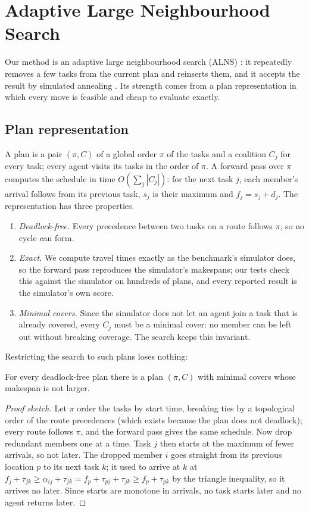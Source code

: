\section{Adaptive Large Neighbourhood Search}
\label{sec:method}

Our method is an adaptive large neighbourhood search (ALNS) \cite{shaw1998using,ropke2006adaptive,pisinger2010large}:
it repeatedly removes a few tasks from the current plan and reinserts them, and it accepts the result by simulated
annealing \cite{kirkpatrick1983optimization}. Its strength comes from a plan representation in which every move is
feasible and cheap to evaluate exactly.

\subsection{Plan representation}
\label{sec:repr}

A plan is a pair $(\pi, C)$ of a global order $\pi$ of the tasks and a coalition $C_j$ for every task; every agent
visits its tasks in the order of $\pi$. A forward pass over $\pi$ computes the schedule in time
$O(\sum_j |C_j|)$: for the next task $j$, each member's arrival follows from its previous task, $s_j$ is their
maximum and $f_j = s_j + d_j$. The representation has three properties.
\begin{enumerate}
\item \emph{Deadlock-free.} Every precedence between two tasks on a route follows $\pi$, so no cycle can form.
\item \emph{Exact.} We compute travel times exactly as the benchmark's simulator does, so the forward pass reproduces
  the simulator's makespans; our tests check this against the simulator on hundreds of plans, and every reported
  result is the simulator's own score.
\item \emph{Minimal covers.} Since the simulator does not let an agent join a task that is already covered, every
  $C_j$ must be a minimal cover: no member can be left out without breaking coverage. The search keeps this invariant.
\end{enumerate}
Restricting the search to such plans loses nothing:
\begin{proposition}
For every deadlock-free plan there is a plan $(\pi, C)$ with minimal covers whose makespan is not larger.
\end{proposition}
\begin{proof}[Proof sketch]
Let $\pi$ order the tasks by start time, breaking ties by a topological order of the route precedences (which exists
because the plan does not deadlock); every route follows $\pi$, and the forward pass gives the same schedule. Now drop
redundant members one at a time. Task $j$ then starts at the maximum of fewer arrivals, so not later. The dropped
member $i$ goes straight from its previous location $p$ to its next task $k$; it used to arrive at $k$ at
$f_j + \tau_{jk} \ge \alpha_{ij} + \tau_{jk} = f_p + \tau_{pj} + \tau_{jk} \ge f_p + \tau_{pk}$ by the triangle
inequality, so it arrives no later. Since starts are monotone in arrivals, no task starts later and no agent returns
later.
\end{proof}

